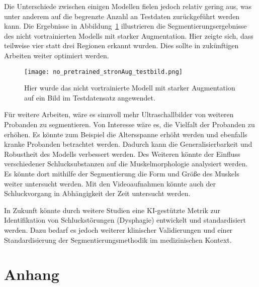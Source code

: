 \documentclass[
	german,
	accentcolor=10c,%
	type=intern,
	marginpar=false
	]{tudapub}
\begin{document}
Die Unterschiede zwischen einigen Modellen fielen jedoch relativ gering aus, was unter anderem auf die begrenzte Anzahl an Testdaten zurückgeführt werden kann. Die Ergebnisse in Abbildung~\ref{fig:Testdaten} illustrieren die Segmentierungsergebnisse des nicht vortrainierten Modells mit starker Augmentation. Hier zeigte sich, dass teilweise vier statt drei Regionen erkannt wurden. Dies sollte in zukünftigen Arbeiten weiter optimiert werden.

\begin{figure}[H]
    \centering
    \texttt{[image: no\_pretrained\_stronAug\_testbild.png]}
    \caption{Hier wurde das nicht vortrainierte Modell mit starker Augmentation auf ein Bild im Testdatensatz angewendet.}
    \label{fig:Testdaten}
\end{figure}

Für weitere Arbeiten, wäre es sinnvoll mehr Ultraschallbilder von weiteren Probanden zu segmentieren. Von Interesse wäre es, die Vielfalt der Probanden zu erhöhen. Es könnte zum Beispiel die Altersspanne erhöht werden und ebenfalls kranke Probanden betrachtet werden. Dadurch kann die Generalisierbarkeit und Robustheit des Modells verbessert werden. Des Weiteren könnte der Einfluss verschiedener Schlucksubstanzen auf die Muskelmorphologie analysiert werden. Es könnte dort mithilfe der Segmentierung die Form und Größe des Muskels weiter untersucht werden. Mit den Videoaufnahmen könnte auch der Schluckvorgang in Abhängigkeit der Zeit untersucht werden. 

In Zukunft könnte durch weitere Studien eine KI-gestützte Metrik zur Identifikation von Schluckstörungen (Dysphagie) entwickelt und standardisiert werden. 
Dazu bedarf es jedoch weiterer klinischer Validierungen und einer Standardisierung der Segmentierungsmethodik im medizinischen Kontext.
\newpage
\section{Anhang}
\end{document}

